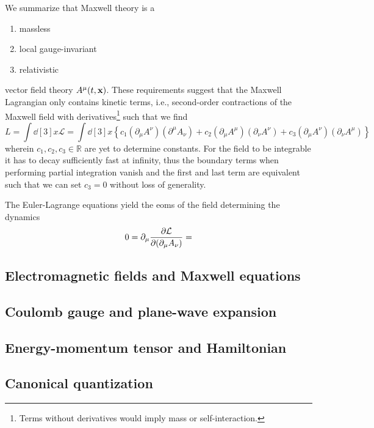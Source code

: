 We summarize that Maxwell theory is a
\begin{enumerate}
	\item massless
	\item local gauge-invariant
	\item relativistic	
\end{enumerate}
vector field theory $A^\mu(t,\vb{x})$.
These requirements suggest that the Maxwell Lagrangian only contains kinetic terms, i.e., second-order contractions of the Maxwell field with derivatives\footnote{Terms without derivatives would imply mass or self-interaction.}
such that we find
\begin{equation}
	L
	=
	\int\dd[3]{x}
	\mathcal{L}
	=
	\int\dd[3]{x}
	\left\{
		c_1
		\left(
			\partial_\mu
			A^\nu
		\right)
		\left(
			\partial^\mu
			A_\nu
		\right)
		+
		c_2
		\left(
			\partial_\mu
			A^\mu
		\right)
		\left(
			\partial_\nu
			A^\nu
		\right)
		+
		c_3
		\left(
			\partial_\mu
			A^\nu
		\right)
		\left(
			\partial_\nu
			A^\mu
		\right)
	\right\}
\end{equation}
wherein $c_1,c_2,c_3\in\mathbb{R}$ are yet to determine constants.
For the field to be integrable it has to decay sufficiently fast at infinity, thus the boundary terms when performing partial integration vanish and the first and last term are equivalent~\cite{deRham2014} such that we can set $c_3=0$ without loss of generality.

The Euler-Lagrange equations yield the \gls{eom}s of the field determining the dynamics
\begin{equation}
	0
	=
	\partial_\mu\pdv{\mathcal{L}}{(\partial_\mu A_\nu)}
	=
\end{equation}

\subsection{Electromagnetic fields and Maxwell equations}

\subsection{Coulomb gauge and plane-wave expansion}


\subsection{Energy-momentum tensor and Hamiltonian}

\subsection{Canonical quantization}

